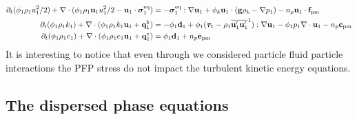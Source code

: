 \begin{align}
    \partial_t (\phi_1 \rho_1u_1^2/2)  
    + \mathbf{\nabla}\cdot (
        \phi_1 \rho_1\textbf{u}_1u_1^2/2
        - \textbf{u}_1 \cdot \bm{\sigma}_1^\text{eq}
    )
    &= 
    - \bm{\sigma}_1^\text{eq}  : \mathbf{\nabla} \textbf{u}_1
    + \phi_k \textbf{u}_1 \cdot (\textbf{g} \rho_k - \mathbf{\nabla} p_1 )
    -  n_p \textbf{u}_1\cdot \textbf{f}_\text{pm}\\
    \partial_t (\phi_1\rho_1k_1)  
    + \mathbf{\nabla}\cdot (
        \phi_1\rho_1k_1\textbf{u}_1
        + \textbf{q}_1^\text{k} 
        )
    &= 
    - \phi_1 \textbf{d}_1 
    +\phi_1 (\bm{\tau}_1 - \rho_1 \overline{\textbf{u}'_1\textbf{u}'_1}^1 ) : \mathbf{\nabla} \textbf{u}_1
    - \phi_1 p_1  \mathbf{\nabla}\cdot\textbf{u}_1
    -n_p  \textbf{c}_\text{pm}\\
    \partial_t (\phi_1\rho_1e_1)  
    + \mathbf{\nabla}\cdot (
        \phi_1 \rho_1e_1\textbf{u}_1
        +
        \textbf{q}_1^\text{e} 
        )
    &= 
    \phi_1 \textbf{d}_1 
    + n_p \textbf{e}_\text{pm}
\end{align}
It is interesting to notice that even through we considered particle fluid particle interactions the PFP stress do not impact the turbulent kinetic energy equations. 

\subsection{The dispersed phase equations}

